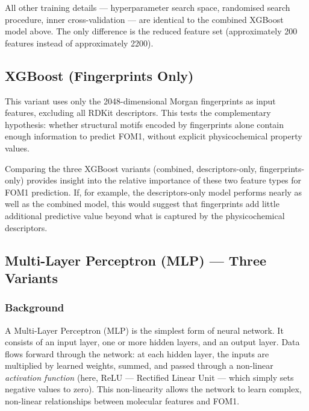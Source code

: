\documentclass[11pt,a4paper]{article}
\begin{document}
All other training details --- hyperparameter search space, randomised search procedure, inner cross-validation --- are identical to the combined XGBoost model above. The only difference is the reduced feature set (approximately 200 features instead of approximately 2200).

\subsection{XGBoost (Fingerprints Only)}

This variant uses only the 2048-dimensional Morgan fingerprints as input features, excluding all RDKit descriptors. This tests the complementary hypothesis: whether structural motifs encoded by fingerprints alone contain enough information to predict FOM1, without explicit physicochemical property values.

Comparing the three XGBoost variants (combined, descriptors-only, fingerprints-only) provides insight into the relative importance of these two feature types for FOM1 prediction. If, for example, the descriptors-only model performs nearly as well as the combined model, this would suggest that fingerprints add little additional predictive value beyond what is captured by the physicochemical descriptors.

\subsection{Multi-Layer Perceptron (MLP) --- Three Variants}

\subsubsection*{Background}

A Multi-Layer Perceptron (MLP) is the simplest form of neural network. It consists of an input layer, one or more hidden layers, and an output layer. Data flows forward through the network: at each hidden layer, the inputs are multiplied by learned weights, summed, and passed through a non-linear \emph{activation function} (here, ReLU --- Rectified Linear Unit --- which simply sets negative values to zero). This non-linearity allows the network to learn complex, non-linear relationships between molecular features and FOM1.
\end{document}
